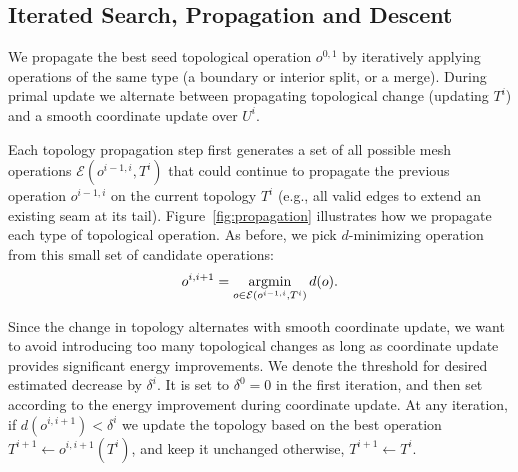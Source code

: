 \subsection{Iterated Search, Propagation and Descent}
\label{sec:topology_search}

We propagate the best seed topological operation $o^{0,1}$ by iteratively applying operations of the same type (a boundary or interior split, or a merge). During primal update we alternate between propagating topological change (updating $T^i$) and a smooth coordinate update over $U^i$.



Each topology propagation step first generates a set of all possible mesh operations $\mathcal{E}(o^{i-1, i}, T^{i})$ that could continue to propagate the previous operation $o^{i-1, i}$ on the current topology $T^{i}$ (e.g., all valid edges to extend an existing seam at its tail). Figure~\ref{fig:propagation} illustrates how we propagate each type of topological operation.
%
As before, we pick $d$-minimizing operation from this small set of candidate operations:
\begin{align}
\label{eq:minE}
o^{i,i+1} = \operatorname*{argmin}_{o \in \mathcal{E}(o^{i-1, i}, T^i)} d(o).
\end{align}

Since the change in topology alternates with smooth coordinate update, we want to avoid introducing too many topological changes as long as coordinate update provides significant energy improvements. We denote the threshold for desired estimated decrease by $\delta^{i}$. It is set to $\delta^0=0$ in the first iteration, and then set according to the energy improvement during coordinate update. At any iteration, if $d(o^{i,i+1}) < \delta^{i}$ we update the topology based on the best operation $T^{i+1} \leftarrow o^{i, i+1}(T^{i})$, and keep it unchanged otherwise, $T^{i+1} \leftarrow T^i$.


